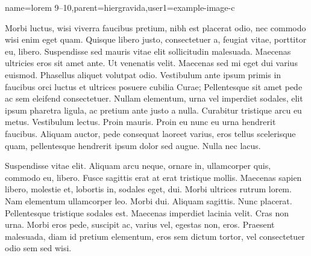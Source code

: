 {name={lorem 9--10},parent={hiergravida},user1={example-image-c}}%
{%
Morbi luctus, wisi viverra faucibus pretium, nibh est placerat odio,
nec commodo wisi enim eget quam. Quisque libero justo, consectetuer
a, feugiat vitae, porttitor eu, libero.  Suspendisse sed mauris
vitae elit sollicitudin malesuada. Maecenas ultricies eros sit amet
ante. Ut venenatis velit. Maecenas sed mi eget dui varius euismod.
Phasellus aliquet volutpat odio.  Vestibulum ante ipsum primis in
faucibus orci luctus et ultrices posuere cubilia Curae; Pellentesque
sit amet pede ac sem eleifend consectetuer. Nullam elementum, urna
vel imperdiet sodales, elit ipsum pharetra ligula, ac pretium ante
justo a nulla. Curabitur tristique arcu eu metus. Vestibulum lectus.
Proin mauris. Proin eu nunc eu urna hendrerit faucibus. Aliquam
auctor, pede consequat laoreet varius, eros tellus scelerisque quam,
pellentesque hendrerit ipsum dolor sed augue. Nulla nec lacus.

Suspendisse vitae elit. Aliquam arcu neque, ornare in, ullamcorper
quis, commodo eu, libero. Fusce sagittis erat at erat tristique
mollis. Maecenas sapien libero, molestie et, lobortis in, sodales
eget, dui. Morbi ultrices rutrum lorem. Nam elementum ullamcorper
leo. Morbi dui. Aliquam sagittis. Nunc placerat.  Pellentesque
tristique sodales est. Maecenas imperdiet lacinia velit. Cras non
urna. Morbi eros pede, suscipit ac, varius vel, egestas non, eros.
Praesent malesuada, diam id pretium elementum, eros sem dictum
tortor, vel consectetuer odio sem sed wisi.%
}
